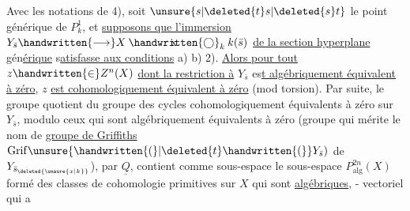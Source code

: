  Avec les notations de 4),  soit $\unsure{s|\deleted{t}s|\deleted{s}t}$ le point générique de $P^1_k$, et \uline{supposons que l'immersion}
$Y_{\bar s}\handwritten{\longrightarrow}X\mathbin{\ooalign{\hfil$\mathrm{x}$\hfil\cr\hfil$\handwritten{\bigcirc}$\hfil\cr}}_k k(\bar s)$ \uline{de la section hyperplane} gén\uline{érique}  s\uline{atisfasse aux conditions} a)  b)  2).
\uline{Alors pour tout} $z\handwritten{\in}Z^n(X)$ \uline{dont la restriction à} $Y_{\bar s}$ es\uline{t algébriquement équivalent à zéro}, $z$ \uline{est cohomologiquement équivalent à zéro} (mod torsion).  Par suite, le groupe quotient du groupe des cycles cohomologiquement équivalents à zéro  sur $Y_{\bar s}$, modulo ceux qui sont algébriquement équivalents à zéro (groupe qui mérite le nom de \uline{groupe de Griffiths} $\mathrm{Grif}\unsure{\handwritten{(}|\deleted{t}\handwritten{(}}Y_{\bar s})$ de $Y_{\bar s_{\deleted{\unsure{x|k}}}}$),  par $\underline{Q}$, contient comme sous-espace le sous-espace $P^{2n}_{\mathrm{alg}}(X)$ formé des classes de cohomologie primitives sur $X$ qui sont \uline{algébriques}, - vectoriel qui a
